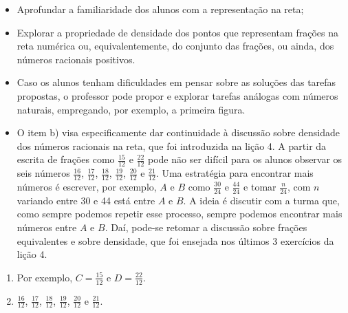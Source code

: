 \begin{multicols}{2}
\begin{objetivos}[label=chap5-ativ12]{}{}


  \begin{itemize} %
    \item       Aprofundar a familiaridade dos alunos com a representação na reta;
    \item       Explorar a propriedade de densidade dos pontos que representam frações na reta numérica ou, equivalentemente, do conjunto das frações, ou ainda, dos números racionais positivos.
  \end{itemize} %

\end{objetivos}


\begin{orientacoes}{}{}

  \begin{itemize} %
    \item       Caso os alunos tenham dificuldades em pensar sobre as soluções das tarefas propostas, o professor pode propor e explorar tarefas análogas com números naturais, empregando, por exemplo, a primeira figura.
    \item O item b) visa especificamente dar continuidade à discussão sobre densidade dos números racionais na reta, que foi introduzida na lição 4. A partir da escrita de frações como $\frac{15}{12}$ e $\frac{22}{12}$       pode não ser difícil para os alunos observar os seis números       $\frac{16}{12}$,       $\frac{17}{12}$,       $\frac{18}{12}$,       $\frac{19}{12}$, $\frac{20}{12}$ e $\frac{21}{12}$. Uma estratégia para encontrar mais números é escrever, por exemplo,       $A$       e       $B$       como       $\frac{30}{24}$       e       $\frac{44}{24}$ e tomar       $\frac{n}{24}$, com       $n$       variando entre 30 e 44 está entre       $A$       e       $B$. A ideia é discutir com a turma que, como sempre podemos repetir esse processo, sempre podemos encontrar mais números entre       $A$       e       $B$. Daí, pode-se retomar a discussão sobre frações equivalentes e sobre densidade, que foi ensejada nos últimos 3 exercícios da lição 4.
  \end{itemize} %

\end{orientacoes}

\begin{solucao}{}{}
\begin{enumerate} [\quad a)] %
  \item         Por exemplo, $C=\frac{15}{12}$     e     $D=\frac{22}{12}$.
  \item         $\frac{16}{12}$,     $\frac{17}{12}$,     $\frac{18}{12}$,     $\frac{19}{12}$,     $\frac{20}{12}$     e     $\frac{21}{12}$.


\end{enumerate}
\end{solucao}
\end{multicols}
